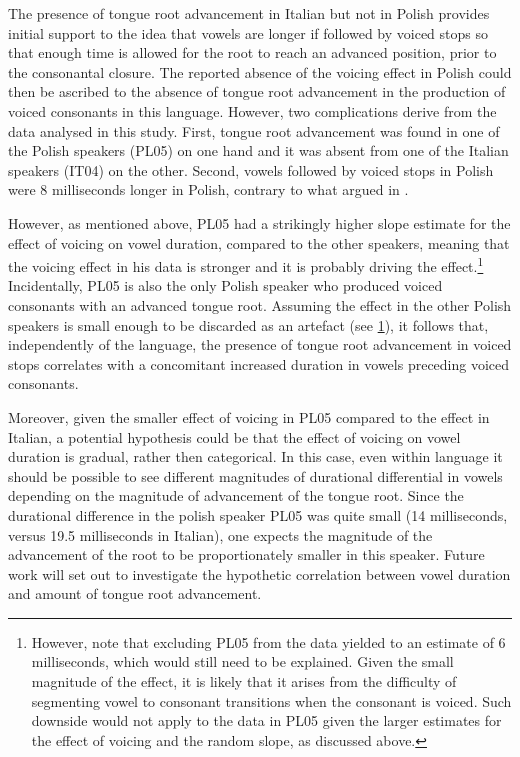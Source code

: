 \documentclass[authoryear, twocolumn]{elsarticle}
\begin{document}
The presence of tongue root advancement in Italian but not in Polish
provides initial support to the idea that vowels are longer if followed
by voiced stops so that enough time is allowed for the root to reach an
advanced position, prior to the consonantal closure. The reported
absence of the voicing effect in Polish could then be ascribed to the
absence of tongue root advancement in the production of voiced
consonants in this language. However, two complications derive from the
data analysed in this study. First, tongue root advancement was found in
one of the Polish speakers (PL05) on one hand and it was absent from one
of the Italian speakers (IT04) on the other. Second, vowels followed by
voiced stops in Polish were 8 milliseconds longer in Polish, contrary to
what argued in \citet{keating1984}.

However, as mentioned above, PL05 had a strikingly higher slope estimate
for the effect of voicing on vowel duration, compared to the other
speakers, meaning that the voicing effect in his data is stronger and it
is probably driving the
effect.\footnote{\label{fn:polish-small} However, note that excluding PL05 from the data yielded to an estimate of 6 milliseconds, which would still need to be explained. Given the small magnitude of the effect, it is likely that it arises from the difficulty of segmenting vowel to consonant transitions when the consonant is voiced. Such downside would not apply to the data in PL05 given the larger estimates for the effect of voicing and the random slope, as discussed above.}
Incidentally, PL05 is also the only Polish speaker who produced voiced
consonants with an advanced tongue root. Assuming the effect in the
other Polish speakers is small enough to be discarded as an artefact
(see \cref{fn:polish-small}), it follows that, independently of the
language, the presence of tongue root advancement in voiced stops
correlates with a concomitant increased duration in vowels preceding
voiced consonants.

Moreover, given the smaller effect of voicing in PL05 compared to the
effect in Italian, a potential hypothesis could be that the effect of
voicing on vowel duration is gradual, rather then categorical. In this
case, even within language it should be possible to see different
magnitudes of durational differential in vowels depending on the
magnitude of advancement of the tongue root. Since the durational
difference in the polish speaker PL05 was quite small (14 milliseconds,
versus 19.5 milliseconds in Italian), one expects the magnitude of the
advancement of the root to be proportionately smaller in this speaker.
Future work will set out to investigate the hypothetic correlation
between vowel duration and amount of tongue root advancement.
\end{document}
